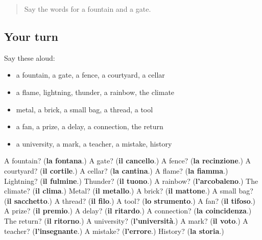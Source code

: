 \begin{quote}
Say the words for a fountain and a gate.
\end{quote}

\subsection*{Your turn}
Say these aloud:

\begin{itemize}
\raggedright
  \item a fountain, a gate, a fence, a courtyard, a cellar
  \item a flame, lightning, thunder, a rainbow, the climate
  \item metal, a brick, a small bag, a thread, a tool
  \item a fan, a prize, a delay, a connection, the return
  \item a university, a mark, a teacher, a mistake, history
\end{itemize}

\begin{tcolorbox}[breakable,colback=teal!4,colframe=teal!35!black,title={Before you move on}]
A fountain? (\textbf{la fontana}.) A gate? (\textbf{il cancello}.) A fence? (\textbf{la recinzione}.) A courtyard? (\textbf{il cortile}.) A cellar? (\textbf{la cantina}.) A flame? (\textbf{la fiamma}.) Lightning? (\textbf{il fulmine}.) Thunder? (\textbf{il tuono}.) A rainbow? (\textbf{l'arcobaleno}.) The climate? (\textbf{il clima}.) Metal? (\textbf{il metallo}.) A brick? (\textbf{il mattone}.) A small bag? (\textbf{il sacchetto}.) A thread? (\textbf{il filo}.) A tool? (\textbf{lo strumento}.) A fan? (\textbf{il tifoso}.) A prize? (\textbf{il premio}.) A delay? (\textbf{il ritardo}.) A connection? (\textbf{la coincidenza}.) The return? (\textbf{il ritorno}.) A university? (\textbf{l'università}.) A mark? (\textbf{il voto}.) A teacher? (\textbf{l'insegnante}.) A mistake? (\textbf{l'errore}.) History? (\textbf{la storia}.)
\end{tcolorbox}
